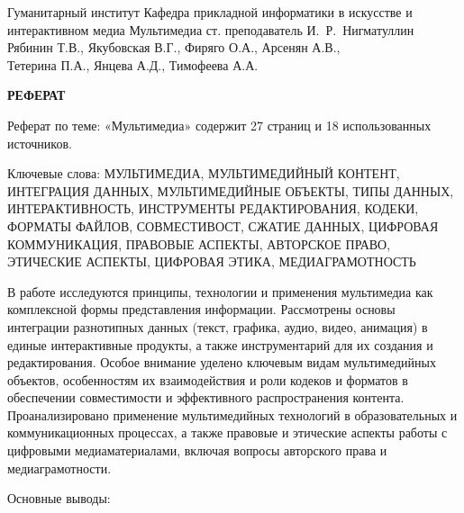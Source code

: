\documentclass{SibFU-docs}
\begin{document}
\renewcommand{\contentsname}{}
\mycovertitle
{Гуманитарный институт}
{Кафедра прикладной информатики в искусстве и интерактивном медиа}
{Мультимедиа}
{ст. преподаватель И.~Р.~Нигматуллин}
{Рябинин Т.В., Якубовская В.Г., Фиряго О.А., Арсенян А.В.,\\Тетерина П.А., Янцева А.Д., Тимофеева А.А.}
 
\begin{center}
\bfseries РЕФЕРАТ
\end{center}
\noindent

Реферат по теме: «Мультимедиа» содержит 27 страниц и 18 использованных источников.

Ключевые слова: МУЛЬТИМЕДИА, МУЛЬТИМЕДИЙНЫЙ КОНТЕНТ, ИНТЕГРАЦИЯ ДАННЫХ, МУЛЬТИМЕДИЙНЫЕ ОБЪЕКТЫ, ТИПЫ ДАННЫХ, ИНТЕРАКТИВНОСТЬ, ИНСТРУМЕНТЫ РЕДАКТИРОВАНИЯ, КОДЕКИ, ФОРМАТЫ ФАЙЛОВ, СОВМЕСТИВОСТ, СЖАТИЕ ДАННЫХ, ЦИФРОВАЯ КОММУНИКАЦИЯ, ПРАВОВЫЕ АСПЕКТЫ, АВТОРСКОЕ ПРАВО, ЭТИЧЕСКИЕ АСПЕКТЫ, ЦИФРОВАЯ ЭТИКА, МЕДИАГРАМОТНОСТЬ

В работе исследуются принципы, технологии и применения мультимедиа как комплексной формы представления информации. Рассмотрены основы интеграции разнотипных данных (текст, графика, аудио, видео, анимация) в единые интерактивные продукты, а также инструментарий для их создания и редактирования. Особое внимание уделено ключевым видам мультимедийных объектов, особенностям их взаимодействия и роли кодеков и форматов в обеспечении совместимости и эффективного распространения контента. Проанализировано применение мультимедийных технологий в образовательных и коммуникационных процессах, а также правовые и этические аспекты работы с цифровыми медиаматериалами, включая вопросы авторского права и медиаграмотности.

Основные выводы:
\end{document}
